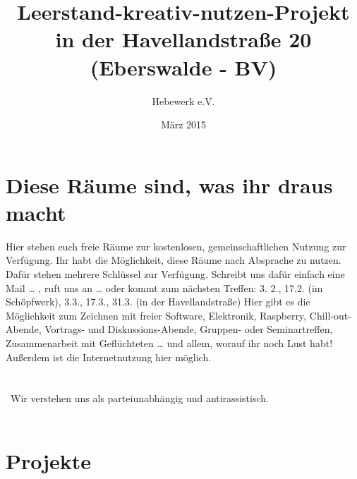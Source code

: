 \documentclass{leaflet}
\begin{document}
\title{Leerstand-kreativ-nutzen-Projekt in der Havellandstraße 20 (Eberswalde - BV)}
\author{Hebewerk e.V.}
\date{März 2015}
\maketitle
\thispagestyle{empty}%
\clearpage

\section{Diese Räume sind, was ihr draus macht} 
Hier stehen euch freie Räume zur kostenlosen, gemeinschaftlichen Nutzung zur Verfügung. Ihr habt die Möglichkeit, diese Räume nach Absprache zu nutzen. Dafür stehen mehrere Schlüssel zur Verfügung. Schreibt uns dafür einfach eine Mail … , ruft uns an … oder kommt zum nächsten Treffen: 3. 2.,  17.2. (im Schöpfwerk), 3.3., 17.3., 31.3. (in der Havellandstraße)
Hier gibt es die Möglichkeit zum Zeichnen mit freier Software, Elektronik, Raspberry, Chill-out-Abende, Vortrags- und Diskussions-Abende, Gruppen- oder Seminartreffen, Zusammenarbeit mit Geflüchteten … und allem, worauf ihr noch Lust habt! Außerdem ist die Internetnutzung hier möglich.\\
\\ \
\\ \
Wir verstehen uns als parteiunabhängig und antirassistisch. 
\\ \


\clearpage


\section{Projekte}
\end{document}
